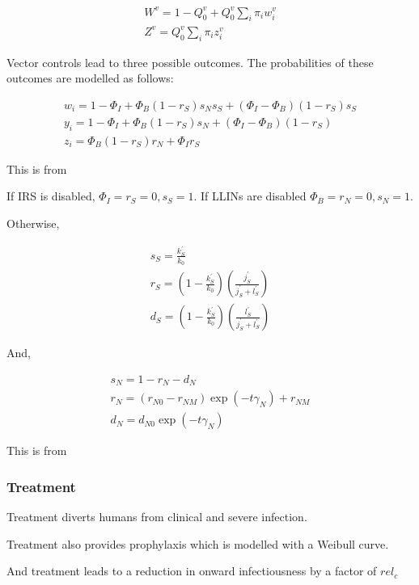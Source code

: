 \documentclass{bmcart}
\begin{document}
\begin{gather*}
    W^v = 1 - Q_0^v + Q_0^v \sum_i \pi_iw_i^v\\
    Z^v = Q_0^v \sum_i \pi_iz_i^v
\end{gather*}

Vector controls lead to three possible outcomes. The probabilities of these outcomes are modelled as follows:

\begin{gather*}
    w_i = 1 - \Phi_I + \Phi_B(1 -  r_S)s_Ns_S + (\Phi_I - \Phi_B)(1 - r_S)s_S\\
    y_i = 1 - \Phi_I + \Phi_B(1 -  r_S)s_N + (\Phi_I - \Phi_B)(1 - r_S)\\
    z_i = \Phi_B(1 - r_S)r_N + \Phi_Ir_S
\end{gather*}

This is from \cite{griffin_reducing_2010}

If IRS is disabled, $\Phi_I = r_S = 0, s_S = 1$. If LLINs are disabled $\Phi_B = r_N = 0, s_N = 1$.

Otherwise,

\begin{gather*}
    s_S = \frac{k^\prime_S}{k_0} \\
    r_S = \left(1 - \frac{k^\prime_S}{k_0}\right)\left(\frac{j^\prime_S}{j^\prime_S + l^\prime_S}\right) \\
    d_S = \left(1 - \frac{k^\prime_S}{k_0}\right)\left(\frac{l^\prime_S}{j^\prime_S + l^\prime_S}\right)
\end{gather*}

And,

\begin{gather*}
    s_N = 1 - r_N - d_N \\ %
    r_N = (r_{N0} - r_{NM})\exp(-t\gamma_N) + r_{NM} \\
    d_N = d_{N0}\exp(-t\gamma_N)
\end{gather*}

This is from \cite{sherrard-smith_systematic_2018}

\subsubsection*{Treatment}

Treatment diverts humans from clinical and severe infection.

Treatment also provides prophylaxis which is modelled with a Weibull curve.

And treatment leads to a reduction in onward infectiousness by a factor of $rel_c$
\end{document}

